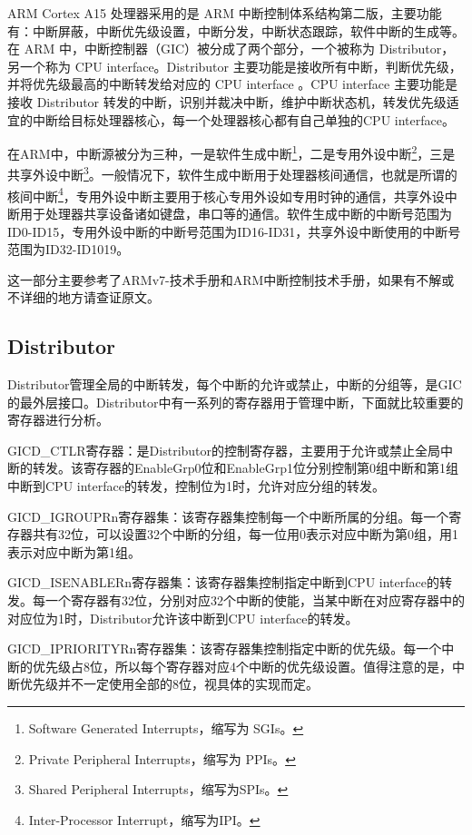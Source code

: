 \documentclass[a4paper, 12pt]{report}
\begin{document}
    ARM Cortex A15 处理器采用的是 ARM 中断控制体系结构第二版，主要功能有：中断屏蔽，中断优先级设置，中断分发，中断状态跟踪，软件中断的生成等。在 ARM 中，中断控制器（GIC）被分成了两个部分，一个被称为 Distributor，另一个称为 CPU interface。Distributor 主要功能是接收所有中断，判断优先级，并将优先级最高的中断转发给对应的 CPU interface 。CPU interface 主要功能是接收 Distributor 转发的中断，识别并裁决中断，维护中断状态机，转发优先级适宜的中断给目标处理器核心，每一个处理器核心都有自己单独的CPU interface。

    在ARM中，中断源被分为三种，一是软件生成中断\footnote{Software Generated Interrupts，缩写为 SGIs。}，二是专用外设中断\footnote{Private Peripheral Interrupts，缩写为 PPIs。}，三是共享外设中断\footnote{Shared Peripheral Interrupts，缩写为SPIs。}。一般情况下，软件生成中断用于处理器核间通信，也就是所谓的核间中断\footnote{Inter-Processor Interrupt，缩写为IPI。}，专用外设中断主要用于核心专用外设如专用时钟的通信，共享外设中断用于处理器共享设备诸如键盘，串口等的通信。软件生成中断的中断号范围为ID0-ID15，专用外设中断的中断号范围为ID16-ID31，共享外设中断使用的中断号范围为ID32-ID1019。
    
    这一部分主要参考了ARMv7-技术手册和ARM中断控制技术手册，如果有不解或不详细的地方请查证原文。
    
    \subsection{Distributor}
    
    Distributor管理全局的中断转发，每个中断的允许或禁止，中断的分组等，是GIC的最外层接口。Distributor中有一系列的寄存器用于管理中断，下面就比较重要的寄存器进行分析。

    GICD\_CTLR寄存器：是Distributor的控制寄存器，主要用于允许或禁止全局中断的转发。该寄存器的EnableGrp0位和EnableGrp1位分别控制第0组中断和第1组中断到CPU interface的转发，控制位为1时，允许对应分组的转发。
    
    GICD\_IGROUPRn寄存器集：该寄存器集控制每一个中断所属的分组。每一个寄存器共有32位，可以设置32个中断的分组，每一位用0表示对应中断为第0组，用1表示对应中断为第1组。
    
    GICD\_ISENABLERn寄存器集：该寄存器集控制指定中断到CPU interface的转发。每一个寄存器有32位，分别对应32个中断的使能，当某中断在对应寄存器中的对应位为1时，Distributor允许该中断到CPU interface的转发。
    
    GICD\_IPRIORITYRn寄存器集：该寄存器集控制指定中断的优先级。每一个中断的优先级占8位，所以每个寄存器对应4个中断的优先级设置。值得注意的是，中断优先级并不一定使用全部的8位，视具体的实现而定。
    
\end{document}
